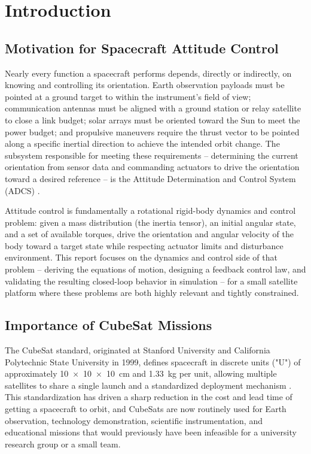 \section{Introduction}
\label{sec:intro}

\subsection{Motivation for Spacecraft Attitude Control}
\label{sec:motivation}

Nearly every function a spacecraft performs depends, directly or indirectly, on knowing and controlling its orientation. Earth observation payloads must be pointed at a ground target to within the instrument's field of view; communication antennas must be aligned with a ground station or relay satellite to close a link budget; solar arrays must be oriented toward the Sun to meet the power budget; and propulsive maneuvers require the thrust vector to be pointed along a specific inertial direction to achieve the intended orbit change. The subsystem responsible for meeting these requirements -- determining the current orientation from sensor data and commanding actuators to drive the orientation toward a desired reference -- is the Attitude Determination and Control System (ADCS) \cite{wertz1978, wie2008}.

Attitude control is fundamentally a rotational rigid-body dynamics and control problem: given a mass distribution (the inertia tensor), an initial angular state, and a set of available torques, drive the orientation and angular velocity of the body toward a target state while respecting actuator limits and disturbance environment. This report focuses on the dynamics and control side of that problem -- deriving the equations of motion, designing a feedback control law, and validating the resulting closed-loop behavior in simulation -- for a small satellite platform where these problems are both highly relevant and tightly constrained.

\subsection{Importance of CubeSat Missions}
\label{sec:cubesat_importance}

The CubeSat standard, originated at Stanford University and California Polytechnic State University in 1999, defines spacecraft in discrete units ("U") of approximately \SI{10x10x10}{\centi\meter} and \SI{1.33}{\kilo\gram} per unit, allowing multiple satellites to share a single launch and a standardized deployment mechanism \cite{cubesatspec2022}. This standardization has driven a sharp reduction in the cost and lead time of getting a spacecraft to orbit, and CubeSats are now routinely used for Earth observation, technology demonstration, scientific instrumentation, and educational missions that would previously have been infeasible for a university research group or a small team.

